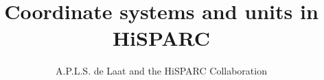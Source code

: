 \title{Coordinate systems and units in HiSPARC}

\author{
A.P.L.S. de Laat and the HiSPARC Collaboration}



\maketitle





